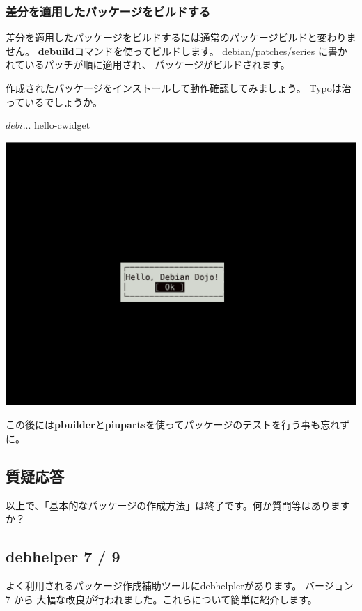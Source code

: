 \documentclass[mingoth,a4paper]{jsarticle}
\begin{document}
\subsubsection{差分を適用したパッケージをビルドする}

差分を適用したパッケージをビルドするには通常のパッケージビルドと変わりません。
{\bf debuild}コマンドを使ってビルドします。
debian/patches/series に書かれているパッチが順に適用され、
パッケージがビルドされます。


作成されたパッケージをインストールして動作確認してみましょう。
Typoは治っているでしょうか。

\begin{terminal}
$ debi
...
$ hello-cwidget
\end{terminal}
\begin{center}
\includegraphics[width=0.5\hsize]{image201209/hello-debian.eps}
\end{center}

この後には{\bf pbuilder}と{\bf piuparts}を使ってパッケージのテストを行う事も忘れずに。

\subsection{質疑応答}
以上で、「基本的なパッケージの作成方法」は終了です。何か質問等はありますか？


\subsection{debhelper 7 / 9}
よく利用されるパッケージ作成補助ツールにdebhelplerがあります。 バージョン7 から
大幅な改良が行われました。これらについて簡単に紹介します。
\end{document}
